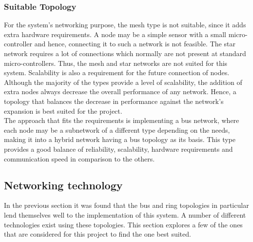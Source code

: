 \subsubsection{Suitable Topology}
For the system's networking purpose, the mesh type is not suitable, since it adds extra hardware requirements.
A node may be a simple sensor with a small micro-controller and hence, connecting it to such a network is not feasible.
The star network requires a lot of connections which normally are not present at standard micro-controllers.
Thus, the mesh and star networks are not suited for this system.
Scalability is also a requirement for the future connection of nodes.
Although the majority of the types provide a level of scalability, the addition of extra nodes always decrease the overall performance of any network.
Hence, a topology that balances the decrease in performance against the network's expansion is best suited for the project.\\

The approach that fits the requirements is implementing a bus network, where each node may be a subnetwork of a different type depending on the needs, making it into a hybrid network having a bus topology as its basis.
This type provides a good balance of reliability, scalability, hardware requirements and communication speed in comparison to the others.
\subsection{Networking technology}
In the previous section it was found that the bus and ring topologies in particular lend themselves well to the implementation of this system.
A number of different technologies exist using these topologies. 
This section explores a few of the ones that are considered for this project to find the one best suited.

